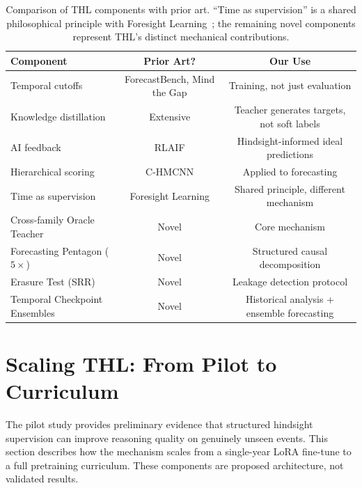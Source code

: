 \documentclass[11pt,a4paper]{article}
\begin{document}
\begin{table}[htbp]
\centering\small
\begin{tabular}{lcc}
\toprule
\textbf{Component} & \textbf{Prior Art?} & \textbf{Our Use} \\
\midrule
Temporal cutoffs & ForecastBench, Mind the Gap & Training, not just evaluation \\
Knowledge distillation & Extensive & Teacher generates targets, not soft labels \\
AI feedback & RLAIF & Hindsight-informed ideal predictions \\
Hierarchical scoring & C-HMCNN & Applied to forecasting \\
Time as supervision & Foresight Learning & Shared principle, different mechanism \\
\midrule
Cross-family Oracle Teacher & Novel & Core mechanism \\
Forecasting Pentagon ($5\times$) & Novel & Structured causal decomposition \\
Erasure Test (SRR) & Novel & Leakage detection protocol \\
Temporal Checkpoint Ensembles & Novel & Historical analysis + ensemble forecasting \\
\bottomrule
\end{tabular}
\caption{Comparison of THL components with prior art. ``Time as supervision'' is a shared philosophical principle with Foresight Learning~\cite{turtel2026futureaslabel}; the remaining novel components represent THL's distinct mechanical contributions.}
\label{tab:prior_art}
\end{table}


\section{Scaling THL: From Pilot to Curriculum}
\label{sec:scaling}

The pilot study provides preliminary evidence that structured hindsight supervision can improve reasoning quality on genuinely unseen events. This section describes how the mechanism scales from a single-year LoRA fine-tune to a full pretraining curriculum. These components are proposed architecture, not validated results.
\end{document}
